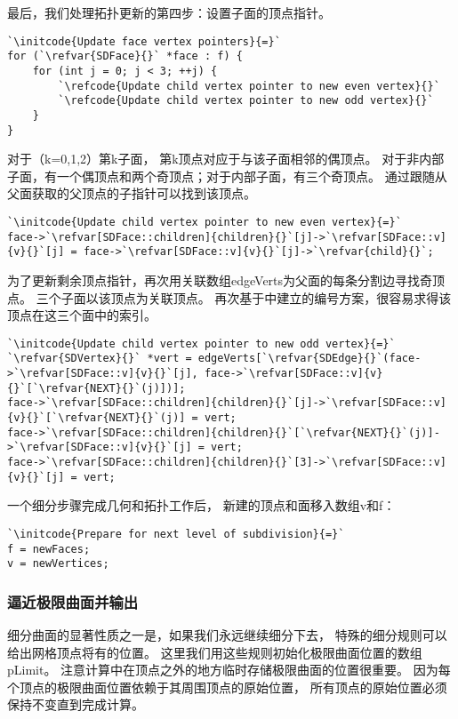 最后，我们处理拓扑更新的第四步：设置子面的顶点指针。
\begin{lstlisting}
`\initcode{Update face vertex pointers}{=}`
for (`\refvar{SDFace}{}` *face : f) {
    for (int j = 0; j < 3; ++j) {
        `\refcode{Update child vertex pointer to new even vertex}{}`
        `\refcode{Update child vertex pointer to new odd vertex}{}`
    }
}
\end{lstlisting}

对于（{\ttfamily k}=0,1,2）第{\ttfamily k}子面，
第{\ttfamily k}顶点对应于与该子面相邻的偶顶点。
对于非内部子面，有一个偶顶点和两个奇顶点；对于内部子面，有三个奇顶点。
通过跟随从父面获取的父顶点的子指针可以找到该顶点。
\begin{lstlisting}
`\initcode{Update child vertex pointer to new even vertex}{=}`
face->`\refvar[SDFace::children]{children}{}`[j]->`\refvar[SDFace::v]{v}{}`[j] = face->`\refvar[SDFace::v]{v}{}`[j]->`\refvar{child}{}`;
\end{lstlisting}

为了更新剩余顶点指针，再次用关联数组{\ttfamily edgeVerts}为父面的每条分割边寻找奇顶点。
三个子面以该顶点为关联顶点。
再次基于中建立的编号方案，很容易求得该顶点在这三个面中的索引。
\begin{lstlisting}
`\initcode{Update child vertex pointer to new odd vertex}{=}`
`\refvar{SDVertex}{}` *vert = edgeVerts[`\refvar{SDEdge}{}`(face->`\refvar[SDFace::v]{v}{}`[j], face->`\refvar[SDFace::v]{v}{}`[`\refvar{NEXT}{}`(j)])];
face->`\refvar[SDFace::children]{children}{}`[j]->`\refvar[SDFace::v]{v}{}`[`\refvar{NEXT}{}`(j)] = vert;
face->`\refvar[SDFace::children]{children}{}`[`\refvar{NEXT}{}`(j)]->`\refvar[SDFace::v]{v}{}`[j] = vert;
face->`\refvar[SDFace::children]{children}{}`[3]->`\refvar[SDFace::v]{v}{}`[j] = vert;
\end{lstlisting}

一个细分步骤完成几何和拓扑工作后，
新建的顶点和面移入数组{\ttfamily v}和{\ttfamily f}：
\begin{lstlisting}
`\initcode{Prepare for next level of subdivision}{=}`
f = newFaces;
v = newVertices;
\end{lstlisting}

\subsubsection*{逼近极限曲面并输出}
细分曲面的显著性质之一是，如果我们永远继续细分下去，
特殊的细分规则可以给出网格顶点将有的位置。
这里我们用这些规则初始化极限曲面位置的数组{\ttfamily pLimit}。
注意计算中在顶点之外的地方临时存储极限曲面的位置很重要。
因为每个顶点的极限曲面位置依赖于其周围顶点的原始位置，
所有顶点的原始位置必须保持不变直到完成计算。

